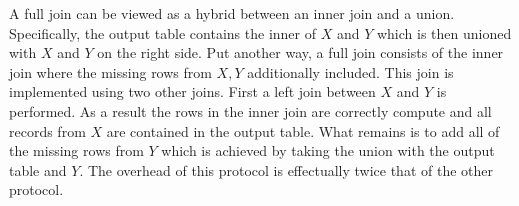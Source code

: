 A full join can be viewed as a hybrid between an inner join and a union. Specifically, the output table contains the inner of $X$ and $Y$ which is then unioned with $X$ and $Y$ on the right side. Put another way, a full join consists of the inner join where the missing rows from $X,Y$ additionally included. This join is implemented using two other joins. First a left join between $X$ and $Y$ is performed. As a result the rows in the inner join are correctly compute and all records from $X$ are contained in the output table. What remains is to add all of the missing rows from $Y$ which is achieved by taking the union with the output table and $Y$. The overhead of this protocol is effectually twice that of the other protocol.

%
%
%

